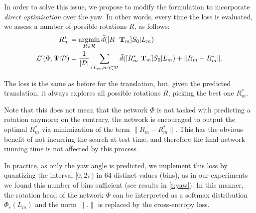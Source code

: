 In order to solve this issue, we propose to modify the formulation to incorporate \emph{direct optimisation} over the yaw.
In other words, every time the loss is evaluated, we assess a number of possible rotations $R$, as follows:
%
%
\begin{align}
  R^*_m
  &= \operatornamewithlimits{argmin}_{R\in \mathcal{R}}
  \bar d([R ~~\mathbf{T}_m] S_0 | L_{m})
  \\\label{e:iteratedloss}
  \mathcal{L}'(\Phi, \Psi|\mathcal{D})
  &=
  \frac{1}{|\mathcal{D}|}
  \sum_{(L_m,m)\in\mathcal{D}}
  \bar d([R^*_m~ \mathbf{T}_m] S_0 | L_{m}) + \lVert R_m - R_m^*\rVert .
\end{align}

The loss is the same as before for the translation, but, given the predicted translation, it always explores all possible rotations $R$, picking the best one $R_m^*$.

Note that this does not mean that the network $\Phi$ is not tasked with predicting a rotation anymore; on the contrary, the network is encouraged to output the optimal $R_m^*$ via minimization of the term $\|R_m - R_m^*\|$.
This has the obvious benefit of not incurring the search at test time, and therefore the final network running time is not affected by this process.

In practice, as only the yaw angle is predicted, we implement this loss by quantizing the interval $[0, 2\pi)$ in 64 distinct values (bins), as in our experiments we found this number of bins sufficient (see results in \cref{t:yaw}).
In this manner, the rotation head of the network $\Phi$ can be interpreted as a softmax distribution $\Phi_r(L_m)$ and the norm $\lVert . \rVert$ is replaced by the cross-entropy loss.

